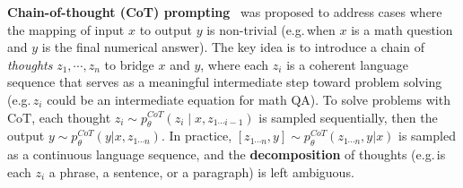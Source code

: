 \documentclass{article}
\begin{document}



\textbf{Chain-of-thought (CoT) prompting}~\citep{wei2022chain} was proposed to address cases where the mapping of input $x$ to output $y$ is  non-trivial (e.g.\,when $x$ is a math question and $y$ is the final numerical answer). The key idea is to introduce a chain of {\em thoughts} $z_1, \cdots, z_n$ to bridge $x$ and $y$, where each $z_i$ is a coherent language sequence that serves as a meaningful intermediate step toward problem solving (e.g.\,$z_i$ could be an intermediate equation for math QA). To solve problems with CoT, each thought $z_i \sim p_\theta^{CoT}(z_i \mid x, z_{1\cdots i-1})$ is sampled sequentially, then the output $y \sim p_\theta^{CoT}(y | x, z_{1 \cdots n})$. In practice, $[z_{1\cdots n}, y] \sim p_\theta^{CoT}(z_{1\cdots n}, y | x)$ is sampled as a continuous language sequence, and the \textbf{decomposition} of thoughts (e.g.\,is each $z_i$ a phrase, a sentence, or a paragraph) is left ambiguous.

\end{document}
